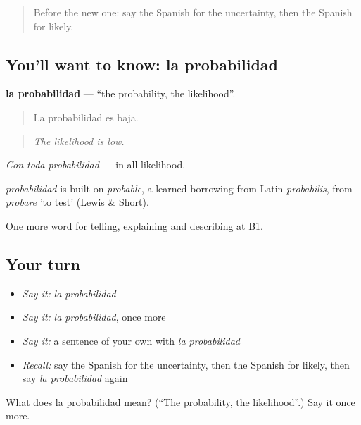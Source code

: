 \label{lesson:ES-C613-probabilidad}



\begin{quote}
Before the new one: say the Spanish for the uncertainty, then the Spanish for likely.
\end{quote}

\subsection*{You'll want to know: la probabilidad}
\textbf{la probabilidad} — \textquotedblleft{}the probability, the likelihood\textquotedblright{}.

\begin{quote}
La probabilidad es baja.
\end{quote}

\begin{quote}
\emph{The likelihood is low.}
\end{quote}

\emph{Con toda probabilidad} — in all likelihood.

\begin{cousinweb}
\emph{probabilidad} is built on \emph{probable}, a learned borrowing from Latin \emph{probabilis}, from \emph{probare} 'to test' (Lewis \& Short).
\end{cousinweb}

\begin{grammarlens}[title={What you've built}]
One more word for telling, explaining and describing at B1.
\end{grammarlens}

\subsection*{Your turn}
\begin{itemize}
\raggedright
  \item \emph{Say it:} \emph{la probabilidad}
  \item \emph{Say it:} \emph{la probabilidad}, once more
  \item \emph{Say it:} a sentence of your own with \emph{la probabilidad}
  \item \emph{Recall:} say the Spanish for the uncertainty, then the Spanish for likely, then say \emph{la probabilidad} again
\end{itemize}

\begin{tcolorbox}[breakable,colback=teal!4,colframe=teal!35!black,title={Before you move on}]
What does la probabilidad mean? (\textquotedblleft{}The probability, the likelihood\textquotedblright{}.) Say it once more.
\end{tcolorbox}
